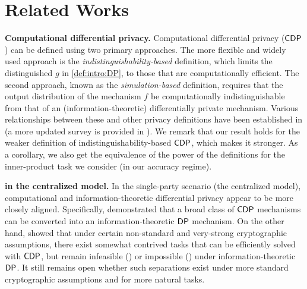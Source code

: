 \section{Related Works}\label{sec:related-works}

\textbf{Computational differential privacy.} Computational differential privacy (${\sf CDP}$) can be defined using two primary approaches.
The more flexible and widely used approach is the \emph{indistinguishability-based} definition, which limits the distinguished $g$ in \cref{def:intro:DP}, to those that are computationally efficient. The second approach, known as the \emph{simulation-based} definition, requires that the output distribution of the mechanism $f$ be computationally indistinguishable from that of an (information-theoretic) differentially private mechanism. Various relationships between these and other privacy definitions have been established in \cite{MPRV09} (a more updated survey is provided in \cite{MeisingsethR25}). We remark that our result holds for the weaker definition of indistinguishability-based ${\sf CDP}$, which makes it stronger. As a corollary, we also get the equivalence of the power of the definitions for the inner-product task we consider (in our accuracy regime).

\textbf{\CDP in the centralized model.} In the single-party scenario (\ie the centralized model), computational and information-theoretic differential privacy appear to be more closely aligned. Specifically, \cite{GKY11} demonstrated that a broad class of ${\sf CDP}$ mechanisms can be converted into an information-theoretic ${\sf DP}$ mechanism. On the other hand, \cite{BunCV16,GhaziIK0M23} showed that under certain non-standard and very-strong cryptographic assumptions, there exist somewhat contrived tasks that can be efficiently solved with ${\sf CDP}$, but remain infeasible (\cite{BunCV16}) or impossible (\cite{GhaziIK0M23}) under information-theoretic ${\sf DP}$. It still remains open whether such separations exist under more standard cryptographic assumptions and for more natural tasks.

